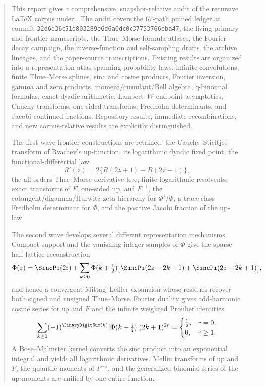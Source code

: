 \documentclass[11pt]{article}
\theoremstyle{definition}
\theoremstyle{remark}
\begin{document}
\begin{abstract}
This report gives a comprehensive, snapshot-relative audit of the recursive LaTeX corpus
under .  The audit covers the 67-path pinned ledger at
commit \texttt{32d6d36c51d803289e6d6a0dc0c37753766eba47}, the living primary and
frontier manuscripts, the Thue--Morse formula atlases, the Fourier-decay campaign, the
inverse-function and self-sampling drafts, the archive lineages, and the paper-source
transcriptions.  Existing results are organized into a representation atlas spanning
probability laws, infinite convolutions, finite Thue--Morse splines, sinc and cosine
products, Fourier inversion, gamma and zero products, moment/cumulant/Bell algebra,
q-binomial formulas, exact dyadic arithmetic, Lambert--\(W\) endpoint asymptotics,
Cauchy transforms, one-sided transforms, Fredholm determinants, and Jacobi continued
fractions.  Repository results, immediate recombinations, and new corpus-relative results
are explicitly distinguished.

The first-wave frontier constructions are retained: the Cauchy--Stieltjes transform of
Rvachev's up-function, its logarithmic dyadic fixed point, the functional-differential law
\[
 R'(z)=2\{R(2z+1)-R(2z-1)\},
\]
the all-orders Thue--Morse derivative tree, finite logarithmic resolvents, exact transforms
of \(F\), one-sided up, and \(F^{-1}\), the cotangent/digamma/Hurwitz-zeta hierarchy for
\(\Phi'/\Phi\), a trace-class Fredholm determinant for \(\Phi\), and the positive Jacobi
fraction of the up-law.

The second wave develops several different representation mechanisms.  Compact support
and the vanishing integer samples of \(\Phi\) give the sparse half-lattice reconstruction
\[
 \Phi(z)=\SincPi(2z)+
 \sum_{k\ge0}\Phi(k+\tfrac12)
 \bigl[\SincPi(2z-2k-1)+
       \SincPi(2z+2k+1)\bigr],
\]
and hence a convergent Mittag--Leffler expansion whose residues recover both signed and
unsigned Thue--Morse.  Fourier duality gives odd-harmonic cosine series for up and \(F\)
and the infinite weighted Prouhet identities
\[
 \sum_{k\ge0}(-1)^{\BinaryDigitSum(k)}|\Phi(k+\tfrac12)|(2k+1)^{2r}
 =\begin{cases}\tfrac12,&r=0,\\0,&r\ge1.\end{cases}
\]
A Bose--Malmsten kernel converts the sinc product into an exponential integral and yields
all logarithmic derivatives.  Mellin transforms of up and \(F\), the quantile moments of
\(F^{-1}\), and the generalized binomial series of the up-moments are unified by one
entire function.


\end{abstract}
\end{document}
